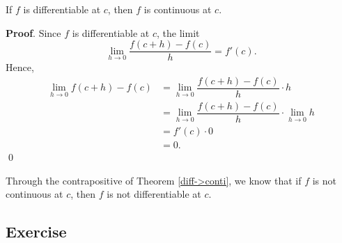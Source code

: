 \documentclass[11pt]{book}
\begin{document}
\begin{theorem}\label{diff->conti}
    If $f$ is differentiable at $c$, then $f$ is continuous at $c$.
\end{theorem}
\textbf{Proof}. Since $f$ is differentiable at $c$, the limit $$\lim_{h\to 0}\dfrac{f(c+h)-f(c)}{h}=f'(c).$$ Hence, \begin{align*}
    \lim_{h\to 0}f(c+h)-f(c)&=\lim_{h\to 0}\dfrac{f(c+h)-f(c)}{h}\cdot h\\
    &=\lim_{h\to 0}\dfrac{f(c+h)-f(c)}{h}\cdot \lim_{h\to 0} h\\
    &=f'(c)\cdot 0\\
    &=0.
\end{align*} \qed

\begin{remark}
    Through the contrapositive of Theorem \ref{diff->conti}, we know that if $f$ is not continuous at $c$, then $f$ is not differentiable at $c$.
\end{remark}

\subsection*{Exercise}
\end{document}
